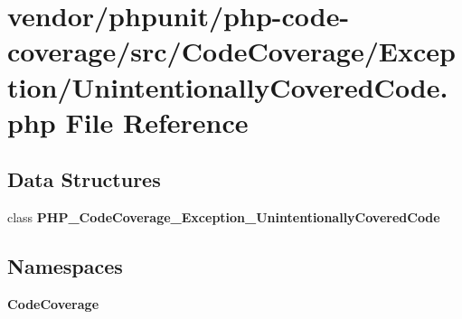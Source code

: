 \section{vendor/phpunit/php-\/code-\/coverage/src/\+Code\+Coverage/\+Exception/\+Unintentionally\+Covered\+Code.php File Reference}
\label{_unintentionally_covered_code_8php}
\subsection*{Data Structures}
\begin{DoxyCompactItemize}
\item 
class {\bf P\+H\+P\+\_\+\+Code\+Coverage\+\_\+\+Exception\+\_\+\+Unintentionally\+Covered\+Code}
\end{DoxyCompactItemize}
\subsection*{Namespaces}
\begin{DoxyCompactItemize}
\item 
 {\bf Code\+Coverage}
\end{DoxyCompactItemize}
